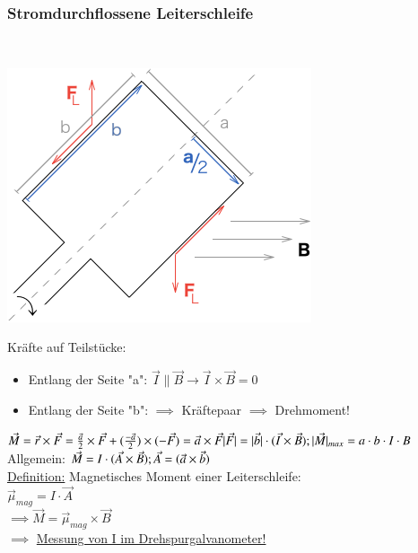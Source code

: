         \subsubsection{Stromdurchflossene Leiterschleife}\leavevmode \\
        
        \begin{center}
        	\includegraphics[width=0.6\linewidth]{skizzen/16/16_1B09}
        \end{center}
      
        Kräfte auf Teilstücke:\\
        \begin{itemize}
        	\item Entlang der Seite "a": $\vec{I}\parallel\vec{B}\rightarrow \vec{I}\times\vec{B}=0 $\\
        	\item Entlang der Seite "b": $\implies$ Kräftepaar $\implies$ Drehmoment!
        \end{itemize}
        
        $\vec{M}=\vec{r}\times\vec{F}=\frac{\vec{a}}{2}\times\vec{F}+(\frac{-\vec{a}}{2})\times(-\vec{F})=\vec{a}\times\vec{F}\\
        \vert\vec{F}\vert=\vert\vec{b}\vert\cdot(\vec{I}\times\vec{B});\hfil \vert\vec{M}\vert_{max}=a\cdot b\cdot I\cdot B$\\
        
        Allgemein: $\vec{M}=I\cdot(\vec{A}\times\vec{B});\hfil \vec{A}=(\vec{a}\times\vec{b})$\\
        
        \underline{Definition:} Magnetisches Moment einer Leiterschleife:\\
        $\boxed{\vec{\mu}_{mag}=I\cdot\vec{A}}$\\
        $ \implies\boxed{\vec{M}=\vec{\mu}_{mag}\times\vec{B}} $\\
        
        $\implies$ \underline{Messung von I im Drehspurgalvanometer!}
        
        
        
        
        
        
        
        
        
        
        
        
        
        
        
\newpage  